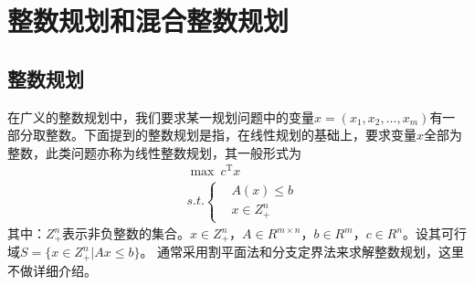 
\chapter{整数规划和混合整数规划}
\section{整数规划}
    \par
    在广义的整数规划中，我们要求某一规划问题中的变量$x=(x_1,x_2,\ldots,x_m)$有一部分取整数。下面提到的整数规划是指，在线性规划的基础上，要求变量$x$全部为整数，此类问题亦称为线性整数规划，其一般形式为
    \begin{align*}
    & \mathop{\max} \  c^\mathrm{T} x\\
    &s.t.\left\{
    \begin{aligned}
    &A(x) \leqslant b\\
    &x \in Z_+^n
    \end{aligned}
    \right.
    \end{align*}
    其中：$Z_+^n$表示非负整数的集合。$x \in Z_+^n$，$A \in R^{m\times n}$，$b \in R^m$，$c \in R^n$。设其可行域$S=\{x \in Z_+^n|Ax \leqslant b\}$。
    通常采用割平面法和分支定界法来求解整数规划，这里不做详细介绍。
